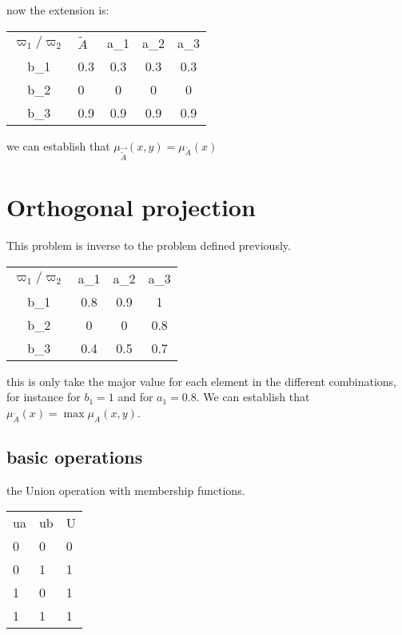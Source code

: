 \documentclass[10pt,a4paper]{article}
\begin{document}
now the extension is:

\begin{table}[h]
\begin{tabular}{clccc}
$\varpi_{1} / \varpi_{2}$    & $\tilde{A}$  & a_{1}  & a_{2}  & a_{3}            \\
b_{1}                       & 0.3 & 0.3 & 0.3 & 0.3 \\
b_{2}                       & 0 & 0 & 0 & 0 \\
b_{3}                       & 0.9 & 0.9 & 0.9 & 0.9
\end{tabular}
\end{table}


we can establish that $\mu_{\vec{\tilde{A}}}(x,y) = \mu_{\tilde{A}}(x)$

\section{Orthogonal projection}
This problem is inverse to the problem defined previously.


\begin{table}[h]
\begin{tabular}{cccc}
$\varpi_{1} / \varpi_{2}$      & a_{1}  & a_{2}  & a_{3}            \\
b_{1}                        & 0.8 & 0.9 &1 \\
b_{2}                      & 0 & 0 & 0.8 \\
b_{3}                        & 0.4 & 0.5 & 0.7
\end{tabular}
\end{table}

this is only take the major value for each element in the different combinations, for instance for $b_{1} = 1$ and for $a_{1}=0.8$.
We can establish that $\mu_{\overleftarrow{A}}(x) = \max \mu_{A}(x,y)$.



\begin{comment}

outrageous;
nasty:
\end{comment}




\subsection{basic operations}
the Union operation with membership functions.
\begin{table}[h]
\begin{tabular}{lll}
ua & ub & U \\
0  & 0  & 0 \\
0  & 1  & 1 \\
1  & 0  & 1 \\
1  & 1  & 1
\end{tabular}
\end{table}
\end{document}
